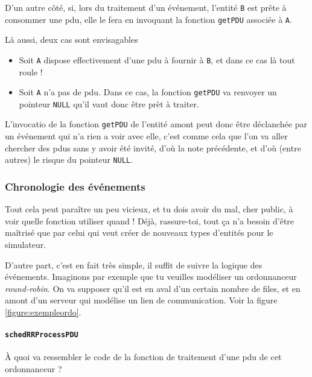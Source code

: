 \documentclass{article}
\begin{document}
   D'un autre côté, si, lors du traitement d'un événement, l'entité
{\tt B} est prête à consommer une {\sc pdu}, elle le fera en invoquant
la fonction \lstinline!getPDU! associée à {\tt A}.

   Là aussi, deux cas sont envisagables

\begin{itemize}
   \item Soit {\tt A} dispose effectivement d'une {\sc pdu} à fournir
     à {\tt B}, et dans ce cas là tout roule !
   \item Soit {\tt A} n'a pas de {\sc pdu}. Dans ce cas, la fonction
     \lstinline!getPDU! va renvoyer un pointeur \lstinline!NULL! qu'il
     vaut donc être prèt à traiter.
\end{itemize}

   L'invocatio de la fonction \lstinline!getPDU! de l'entité amont
peut donc être déclanchée par un événement qui n'a rien a voir avec
elle, c'est comme cela que l'on va aller chercher des {\sc pdu}s sans
y avoir été invité, d'où la note précédente, et d'où (entre autres) le
risque du pointeur \lstinline!NULL!.

%
\subsubsection{Chronologie des événements}

  Tout cela peut paraître un peu vicieux, et tu dois avoir du mal,
cher public, à voir quelle fonction utiliser quand ! Déjà,
rassure-toi, tout ça n'a besoin d'être maîtrisé que par celui qui veut
créer de nouveaux types d'entités pour le simulateur.

   D'autre part, c'est en fait très simple, il suffit de suivre la
logique des événements. Imaginons par exemple que tu veuilles
modéliser un ordonnanceur {\em round-robin}. On va supposer qu'il est
en aval d'un certain nombre de files, et en amont d'un serveur qui
modélise un lien de communication. Voir la figure
\ref{figure:exempleordo}.


%
%
%
\paragraph{\lstinline!schedRRProcessPDU!}

   À quoi va ressembler le code de la fonction de traitement d'une
{\sc pdu} de cet ordonnanceur ? 
\end{document}
